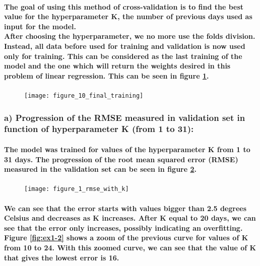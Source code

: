 \documentclass[a4paper]{article}
\begin{document}
\paragraph{The goal of using this method of cross-validation is to find the best value for the hyperparameter K, the number of previous days used as input for the model.\\After choosing the hyperparameter, we no more use the folds division. Instead, all data before used for training and validation is now used only for training. This can be considered as the last training of the model and the one which will return the weights desired in this problem of linear regression. This can be seen in figure \ref{fig:pre-ex1-10}.}

\begin{figure}[H]
    \centering
    \texttt{[image: figure\_10\_final\_training]}
    \caption{}
    \label{fig:pre-ex1-10}
\end{figure}

\subsubsection{a) Progression of the RMSE measured in validation set in function of hyperparameter K (from 1 to 31):}

\paragraph{The model was trained for values of the hyperparameter K from 1 to 31 days. The progression of the root mean squared error (RMSE) measured in the validation set can be seen in figure \ref{fig:ex1-1}.}

\begin{figure}[H]
    \centering
    \texttt{[image: figure\_1\_rmse\_with\_k]}
    \caption{}
    \label{fig:ex1-1}
\end{figure}

\paragraph{We can see that the error starts with values bigger than 2.5 degrees Celsius and decreases as K increases. After K equal to 20 days, we can see that the error only increases, possibly indicating an overfitting.\\Figure \ref{fig:ex1-2} shows a zoom of the previous curve for values of K from 10 to 24. With this zoomed curve, we can see that the value of K that gives the lowest error is 16.}
\end{document}
